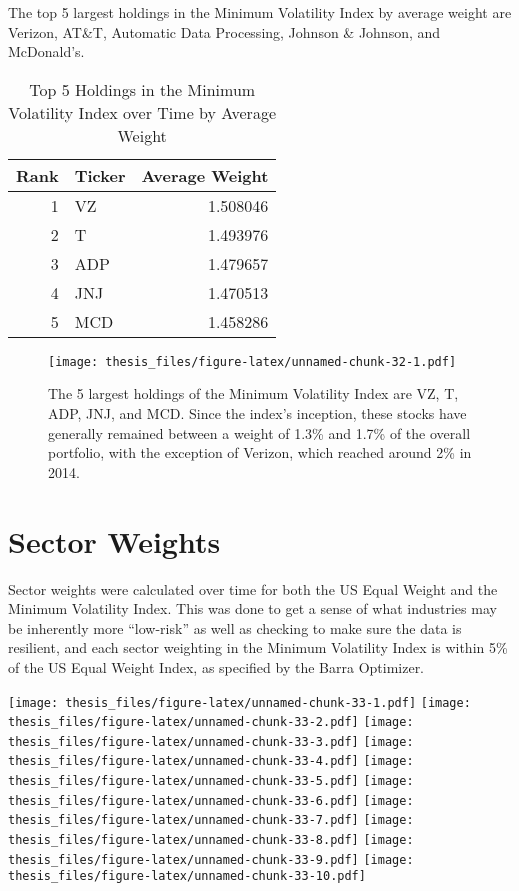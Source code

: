 \documentclass[12pt,twoside]{reedthesis}
\theoremstyle{definition}
\theoremstyle{definition}
\theoremstyle{definition}
\theoremstyle{remark}
\begin{document}
The top 5 largest holdings in the Minimum Volatility Index by average
weight are Verizon, AT\&T, Automatic Data Processing, Johnson \&
Johnson, and McDonald's.
\begin{longtable}[t]{rlr}
\caption{\label{tab:unnamed-chunk-30}Top 5 Holdings in the Minimum Volatility Index over Time by Average Weight}\\
\toprule
Rank & Ticker & Average Weight\\
\midrule
1 & VZ & 1.508046\\
2 & T & 1.493976\\
3 & ADP & 1.479657\\
4 & JNJ & 1.470513\\
5 & MCD & 1.458286\\
\bottomrule
\end{longtable}
\begin{figure}[htbp]
\centering
\texttt{[image: thesis\_files/figure-latex/unnamed-chunk-32-1.pdf]}
\caption{\label{fig:unnamed-chunk-32}The 5 largest holdings of the Minimum
Volatility Index are VZ, T, ADP, JNJ, and MCD. Since the index's
inception, these stocks have generally remained between a weight of
1.3\% and 1.7\% of the overall portfolio, with the exception of Verizon,
which reached around 2\% in 2014.}
\end{figure}
\section{Sector Weights}\label{sector-weights}

Sector weights were calculated over time for both the US Equal Weight
and the Minimum Volatility Index. This was done to get a sense of what
industries may be inherently more ``low-risk'' as well as checking to
make sure the data is resilient, and each sector weighting in the
Minimum Volatility Index is within 5\% of the US Equal Weight Index, as
specified by the Barra Optimizer.

\texttt{[image: thesis\_files/figure-latex/unnamed-chunk-33-1.pdf]}
\texttt{[image: thesis\_files/figure-latex/unnamed-chunk-33-2.pdf]}
\texttt{[image: thesis\_files/figure-latex/unnamed-chunk-33-3.pdf]}
\texttt{[image: thesis\_files/figure-latex/unnamed-chunk-33-4.pdf]}
\texttt{[image: thesis\_files/figure-latex/unnamed-chunk-33-5.pdf]}
\texttt{[image: thesis\_files/figure-latex/unnamed-chunk-33-6.pdf]}
\texttt{[image: thesis\_files/figure-latex/unnamed-chunk-33-7.pdf]}
\texttt{[image: thesis\_files/figure-latex/unnamed-chunk-33-8.pdf]}
\texttt{[image: thesis\_files/figure-latex/unnamed-chunk-33-9.pdf]}
\texttt{[image: thesis\_files/figure-latex/unnamed-chunk-33-10.pdf]}
\end{document}
